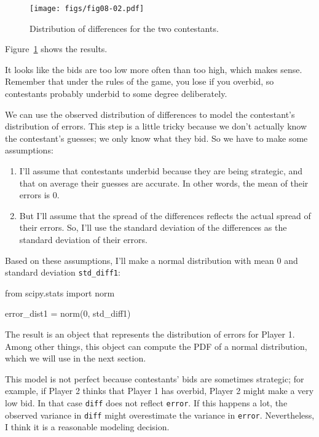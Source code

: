 \documentclass[12pt]{book}
\theoremstyle{exercise}
\newcommand{\py}[1]{{\tt #1}}%
\begin{document}
\begin{figure}
\centerline{\texttt{[image: figs/fig08-02.pdf]}}
\caption{Distribution of differences for the two contestants.}
\label{fig08-02}
\end{figure}

Figure~\ref{fig08-02} shows the results.

It looks like the bids are too low more often than too high, which makes sense.
Remember that under the rules of the game, you lose if you overbid, so contestants probably underbid to some degree deliberately.

We can use the observed distribution of differences to model the contestant's distribution of errors.
This step is a little tricky because we don't actually know the contestant's guesses; we only know what they bid.
So we have to make some assumptions:

\begin{enumerate}

\item I'll assume that contestants underbid because they are being strategic, and that on average their guesses are accurate.  In other words, the mean of their errors is 0.

\item But I'll assume that the spread of the differences reflects the actual spread of their errors.  So, I'll use the standard deviation of the differences as the standard deviation of their errors.

\end{enumerate}

Based on these assumptions, I'll make a normal distribution with mean 0 and standard deviation \py{std_diff1}:

\begin{code}
from scipy.stats import norm

error_dist1 = norm(0, std_diff1)
\end{code}

The result is an object that represents the distribution of errors for Player 1.
Among other things, this object can compute the PDF of a normal distribution, which we will use in the next section.


This model is not perfect because contestants' bids are sometimes strategic; for example, if Player 2 thinks that Player 1
has overbid, Player 2 might make a very low bid.
In that case \py{diff} does not reflect \py{error}.
If this happens a lot, the observed variance in \py{diff} might overestimate the variance in \py{error}.
Nevertheless, I think it is a reasonable modeling decision.
\end{document}
